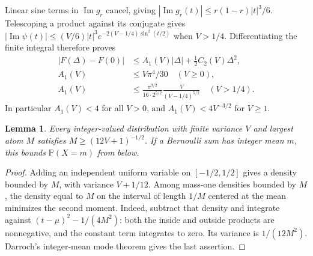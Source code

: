 \documentclass[11pt]{article}
\newtheorem{lemma}[theorem]{Lemma}
\theoremstyle{remark}\newtheorem{remark}[theorem]{Remark}
\newcommand{\Prb}{\mathbb P}
\begin{document}
Linear sine terms in $\operatorname{Im}g_r$ cancel, giving
$|\operatorname{Im}g_r(t)|\le r(1-r)|t|^3/6$.
Telescoping a product against its conjugate gives
$|\operatorname{Im}\psi(t)|\le(V/6)|t|^3
 e^{-2(V-1/4)\sin^2(t/2)}$ when $V>1/4$.
Differentiating the finite integral therefore proves
\begin{align}
 |F(\Delta)-F(0)|&\le A_1(V)|\Delta|
                       +\tfrac12C_2(V)\Delta^2,\label{eq:shift}\\
 A_1(V)&\le V\pi^4/30\quad(V\ge0),\\
 A_1(V)&\le\frac{\pi^{9/2}}{16\cdot2^{5/2}}
                   \frac{V}{(V-1/4)^{5/2}}\quad(V>1/4).\label{eq:A1general}
\end{align}
In particular $A_1(V)<4$ for all $V>0$, and
$A_1(V)<4V^{-3/2}$ for $V\ge1$.

\begin{lemma}\label{lem:mode}
Every integer-valued distribution with finite variance $V$ and largest atom
$M$ satisfies $M\ge(12V+1)^{-1/2}$. If a Bernoulli sum has integer mean $m$,
this bounds $\Prb(X=m)$ from below.
\end{lemma}
\begin{proof}
Adding an independent uniform variable on $[-1/2,1/2]$ gives a density bounded
by $M$, with variance $V+1/12$. Among mass-one densities bounded by $M$, the
density equal to $M$ on the interval of length $1/M$ centered at the mean
minimizes the second moment. Indeed, subtract that density and integrate
against $(t-\mu)^2-1/(4M^2)$: both the inside and outside products are
nonnegative, and the constant term integrates to zero. Its variance is
$1/(12M^2)$. Darroch's integer-mean mode theorem gives the last assertion.
\end{proof}
\end{document}
